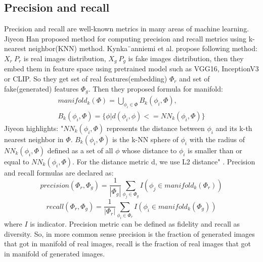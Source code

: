 \subsection{Precision and recall}
Precision and recall are well-known metrics in many areas of machine learning. Jiyeon Han proposed method for computing precision and recall metrics using k-nearest neighbor(KNN) method\cite{RarityScore}. Kynka¨anniemi et al. propose following method\cite{Precision_recall}: $X_r ~ P_r$ is real images distribution, $X_g ~ P_g$  is fake images distribution, then they embed them in feature space using pretrained model such as VGG16, InceptionV3 or CLIP. So they get set of real features(embedding) $\Phi_r$ and set of fake(generated) features $\Phi_g$. Then they proposed formula for manifold: 
\begin{equation}
\begin{split}
manifold_k(\Phi)=\bigcup_{\phi_i\in\Phi}B_k(\phi_i, \Phi),\\ B_k(\phi_i, \Phi)=\{\phi|d(\phi_i, \phi) <= NN_k(\phi_i,\Phi)\}
\end{split}
\end{equation}
Jiyeon highlights\cite{RarityScore}: "$NN_k(\phi_i, \Phi)$ represents the distance between $\phi_i$ and its k-th nearest neighbor in $\Phi$. $B_k(\phi_i, \Phi)$ is the k-NN sphere of $\phi_i$ with the radius of $NN_k(\phi_i, \Phi)$ defined as a set of all $\phi$ whose distance to $\phi_i$ is smaller than or equal to $NN_k(\phi_i, \Phi)$. For the distance metric d, we use L2 distance" \cite[p.2]{RarityScore}. Precision and recall formulas are declared as\cite{Precision_recall}:
\begin{equation}
precision(\Phi_r,\Phi_g)=\frac{1}{|\Phi_g|}\sum\limits_{\phi_j\in\Phi_g}I(\phi_j\in manifold_k(\Phi_r))
\end{equation}
\begin{equation}
recall(\Phi_r,\Phi_g)=\frac{1}{|\Phi_r|}\sum\limits_{\phi_i\in\Phi_r}I(\phi_i\in manifold_k(\Phi_g))
\end{equation}
where $I$ is indicator. Precision metric can be defined as fidelity and recall as diversity. So, in more common sense precision is the fraction of generated images that got in manifold of real images, recall is the fraction of real images that got in manifold of generated images. 
